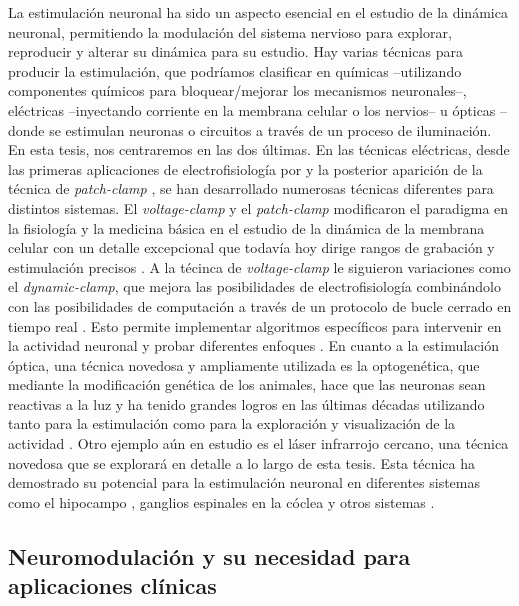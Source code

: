 La estimulación neuronal ha sido un aspecto esencial en el estudio de la dinámica neuronal, permitiendo la modulación del sistema nervioso para explorar, reproducir y alterar su dinámica para su estudio. Hay varias técnicas para producir la estimulación, que podríamos clasificar en químicas --utilizando componentes químicos para bloquear/mejorar los mecanismos neuronales--, eléctricas --inyectando corriente en la membrana celular o los nervios-- u ópticas --donde se estimulan neuronas o circuitos a través de un proceso de iluminación. En esta tesis, nos centraremos en las dos últimas. En las técnicas eléctricas, desde las primeras aplicaciones de electrofisiología por \cite{neher_single-channel_1976} y la posterior aparición de la técnica de \textit{patch-clamp} \cite{hamill_improved_1981}, se han desarrollado numerosas técnicas diferentes para distintos sistemas. El \textit{voltage-clamp }y el \textit{patch-clamp} modificaron el paradigma en la fisiología y la medicina básica en el estudio de la dinámica de la membrana celular con un detalle excepcional que todavía hoy dirige rangos de grabación y estimulación precisos \parencite{hamill_improved_1981}. A la técinca de \textit{voltage-clamp} le siguieron variaciones como el \textit{dynamic-clamp}, que mejora las posibilidades de electrofisiología combinándolo con las posibilidades de computación a través de un protocolo de bucle cerrado en tiempo real \parencite{nowotny_dynamic_2022}. Esto permite implementar algoritmos específicos para intervenir en la actividad neuronal y probar diferentes enfoques \parencite{chamorro_generalization_2012}. En cuanto a la estimulación óptica, una técnica novedosa y ampliamente utilizada es la optogenética, que mediante la modificación genética de los animales, hace que las neuronas sean reactivas a la luz y ha tenido grandes logros en las últimas décadas utilizando tanto para la estimulación como para la exploración y visualización de la actividad \parencite{chen_roles_2022}. Otro ejemplo aún en estudio es el láser infrarrojo cercano, una técnica novedosa que se explorará en detalle a lo largo de esta tesis. Esta técnica ha demostrado su potencial para la estimulación neuronal en diferentes sistemas como el hipocampo \parencite{liang_temperature-dependent_2009}, ganglios espinales en la cóclea \parencite{goyal_acute_2012, barrett_pulsed_2018, brown_thermal_2020} y otros sistemas \parencite{shapiro_infrared_2012, cayce_infrared_2014, begeng_activity_2022}.

\subsection{Neuromodulación y su necesidad para aplicaciones clínicas}

